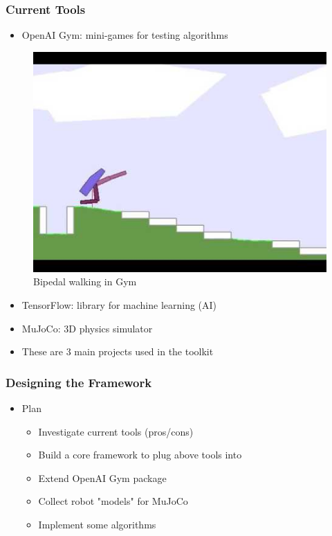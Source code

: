 \documentclass[handout]{beamer}
\begin{document}
\begin{frame}
    \frametitle{Current Tools}
    \begin{itemize}
        \item{OpenAI Gym: mini-games for testing algorithms}
    \end{itemize}
    \begin{figure}
        \includegraphics[scale=0.2]{walker}
        \caption{Bipedal walking in Gym}
    \end{figure}
    \begin{itemize}
        \item{TensorFlow: library for machine learning (AI)}
        \item{MuJoCo: 3D physics simulator}
        \item{These are 3 main projects used in the toolkit}
    \end{itemize}
\end{frame}
\begin{frame}
    \frametitle{Designing the Framework}
    \begin{itemize}
        \item{Plan}
        \begin{itemize}
            \item{Investigate current tools (pros/cons)}
            \item{Build a core framework to plug above tools into}
            \item{Extend OpenAI Gym package}
            \item{Collect robot "models" for MuJoCo}
            \item{Implement some algorithms}
        \end{itemize}
    \end{itemize}
\end{frame}
\end{document}
